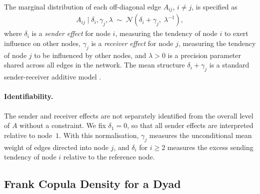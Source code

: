 The marginal distribution of each off-diagonal edge $A_{ij}$, $i \neq j$,
is specified as
%
\begin{align}
\label{eq:marginal}
A_{ij} \mid \delta_i, \gamma_j, \lambda
  \;\sim\; \mathcal{N}\!\left(\delta_i + \gamma_j,\; \lambda^{-1}\right),
\end{align}
%
where $\delta_i$ is a \emph{sender effect} for node $i$, measuring the
tendency of node $i$ to exert influence on other nodes, $\gamma_j$ is a
\emph{receiver effect} for node $j$, measuring the tendency of node $j$ to
be influenced by other nodes, and $\lambda > 0$ is a precision parameter
shared across all edges in the network.  The mean structure $\delta_i +
\gamma_j$ is a standard sender-receiver additive model \citep{hoff2005}.

\paragraph{Identifiability.}
The sender and receiver effects are not separately identified from the
overall level of $A$ without a constraint.  We fix $\delta_1 = 0$,
so that all sender effects are interpreted relative to node~$1$.  With
this normalisation, $\gamma_j$ measures the unconditional mean weight of
edges directed into node $j$, and $\delta_i$ for $i \geq 2$ measures
the excess sending tendency of node $i$ relative to the reference node.

\subsection{Frank Copula Density for a Dyad}

